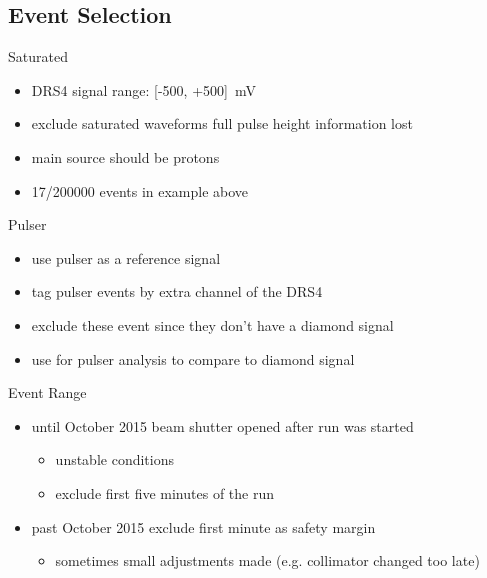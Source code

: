 \subsection{Event Selection}
\begin{frame}[noframenumbering]{Saturated}


	\begin{itemize}\itemfill
		\item DRS4 signal range: [-500, +500]\, mV
		\item exclude saturated waveforms \ra full pulse height information lost
		\item main source should be protons
		\item 17/200000 events in example above
	\end{itemize}
	
\end{frame}
\begin{frame}[noframenumbering]{Pulser}


	\begin{itemize}\itemfill
		\item<1-> use pulser as a reference signal
		\item<1-> tag pulser events by extra channel of the DRS4
		\item<2-> exclude these event since they don't have a diamond signal
		\item<2-> use for pulser analysis to compare to diamond signal
	\end{itemize}
	
\end{frame}
\begin{frame}[noframenumbering]{Event Range}
	
	\vspace*{-10pt}

	\begin{itemize}\itemfill
		\item until October 2015 \ra beam shutter opened after run was started
		\begin{itemize}
			\item unstable conditions
			\item exclude first five minutes of the run\vspace*{5pt}
		\end{itemize}
		\item past October 2015 exclude first minute as safety margin
		\begin{itemize}
			\item sometimes small adjustments made (e.g. collimator changed too late)
		\end{itemize}

	\end{itemize}
	
\end{frame}
